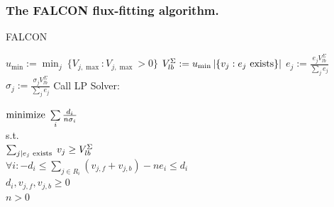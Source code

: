 \documentclass[compress,red,notes]{beamer}
\begin{document}
\begin{frame}[fragile]
\frametitle{The FALCON flux-fitting algorithm.}

\begin{algorithm}[H]
\tiny
\caption{FALCON}
\label{alg:FALCON}
\begin{algorithmic}
\State $u_{\min} := \min_j\ \{V_{j,\max} : V_{j,\max} > 0\}$
\State $V_{lb}^{\Sigma} := u_{\min} \left|\{v_j : e_j \textnormal{ exists}\}\right|$
  \State $e_j := \frac{e_j V_{lb}^{\Sigma}}
    {\sum\limits_{j} e_j}$ 
  \State $\sigma_j := \frac{\sigma_j V_{lb}^{\Sigma}}
    {\sum\limits_{j} e_j}$
\EndFor
{}
  \State Call LP Solver:
  \State \hspace{4.8mm} \parbox[t]{\dimexpr\linewidth-\algorithmicindent}{
    $\textnormal{minimize}\ \sum\limits_i \frac{d_i}{n \sigma_i}$\\
    s.t.\\
    $\sum_{j \mid e_j \textnormal{ exists }} v_j \geq V_{lb}^{\Sigma}$\\ 
    $\forall i: -d_i \leq \sum\nolimits_{j \in R_i} (v_{j,f} +
    v_{j,b}) - n e_i \leq d_i$\\ 
    $d_i, v_{j,f}, v_{j,b} \geq 0$\\ 
    $n > 0$
    \strut}
  \EndFor
\EndWhile
\end{algorithmic}
\end{algorithm}

\end{frame}

\end{document}
